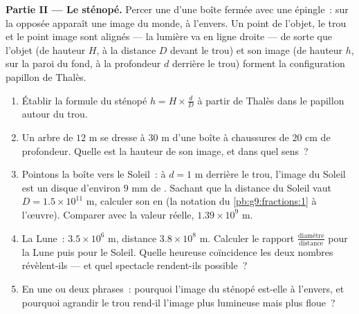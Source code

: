 \begin{problem}
\medskip
\noindent\textbf{Partie II --- Le sténopé.}
Percer une  d'une boîte fermée avec une épingle~: sur la 
opposée apparaît une image du monde, à l'envers. Un point de l'objet,
le trou et le point image sont alignés --- la lumière va en ligne
droite --- de sorte que l'objet (de hauteur $H$, à la distance $D$
devant le trou) et son image (de hauteur $h$, sur la paroi du fond, à
la profondeur $d$ derrière le trou) forment la configuration papillon
de Thalès.
\begin{enumerate}[resume]
  \item Établir la formule du sténopé $h = H \times \frac dD$ à
        partir de Thalès dans le papillon autour du trou.
  \item Un arbre de $12$ m se dresse à $30$ m d'une boîte à
        chaussures de $20$ cm de profondeur. Quelle est la hauteur
        de son image, et dans quel sens~?
  \item Pointons la boîte vers le Soleil~: à $d = 1$ m derrière le
        trou, l'image du Soleil est un disque d'environ $9$ mm de
        . Sachant que la distance du Soleil vaut
        $D = 1.5 \times 10^{11}$ m, calculer son  en
         (la notation du
        \cref{pb:g9:fractions:1} à l'œuvre). Comparer avec la valeur
        réelle, $1.39 \times 10^9$ m.
  \item La Lune~:  $3.5 \times 10^6$ m, distance
        $3.8 \times 10^8$ m. Calculer le rapport
        $\frac{\text{diamètre}}{\text{distance}}$ pour la Lune puis
        pour le Soleil. Quelle heureuse coïncidence les deux nombres
        révèlent-ils --- et quel spectacle rendent-ils possible~?
  \item En une ou deux phrases~: pourquoi l'image du sténopé est-elle
        à l'envers, et pourquoi agrandir le trou rend-il l'image plus
        lumineuse mais plus floue~?
\end{enumerate}


\end{problem}
